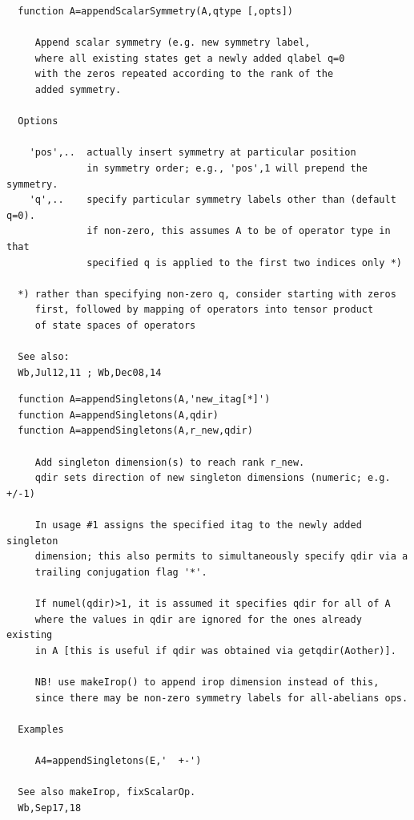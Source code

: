 \documentclass[twoside,12pt]{article}
\begin{document}
\pagebreak[3]



\begin{verbatim}
  function A=appendScalarSymmetry(A,qtype [,opts])
 
     Append scalar symmetry (e.g. new symmetry label,
     where all existing states get a newly added qlabel q=0
     with the zeros repeated according to the rank of the
     added symmetry.
 
  Options
 
    'pos',..  actually insert symmetry at particular position
              in symmetry order; e.g., 'pos',1 will prepend the symmetry.
    'q',..    specify particular symmetry labels other than (default q=0).
              if non-zero, this assumes A to be of operator type in that
              specified q is applied to the first two indices only *)
 
  *) rather than specifying non-zero q, consider starting with zeros
     first, followed by mapping of operators into tensor product
     of state spaces of operators
 
  See also: 
  Wb,Jul12,11 ; Wb,Dec08,14
\end{verbatim}

\pagebreak[3]



\begin{verbatim}
  function A=appendSingletons(A,'new_itag[*]')
  function A=appendSingletons(A,qdir)
  function A=appendSingletons(A,r_new,qdir)
 
     Add singleton dimension(s) to reach rank r_new.
     qdir sets direction of new singleton dimensions (numeric; e.g. +/-1)
 
     In usage #1 assigns the specified itag to the newly added singleton
     dimension; this also permits to simultaneously specify qdir via a
     trailing conjugation flag '*'.
 
     If numel(qdir)>1, it is assumed it specifies qdir for all of A
     where the values in qdir are ignored for the ones already existing
     in A [this is useful if qdir was obtained via getqdir(Aother)].
 
     NB! use makeIrop() to append irop dimension instead of this,
     since there may be non-zero symmetry labels for all-abelians ops.
 
  Examples
 
     A4=appendSingletons(E,'  +-')
 
  See also makeIrop, fixScalarOp.
  Wb,Sep17,18
\end{verbatim}
\end{document}
